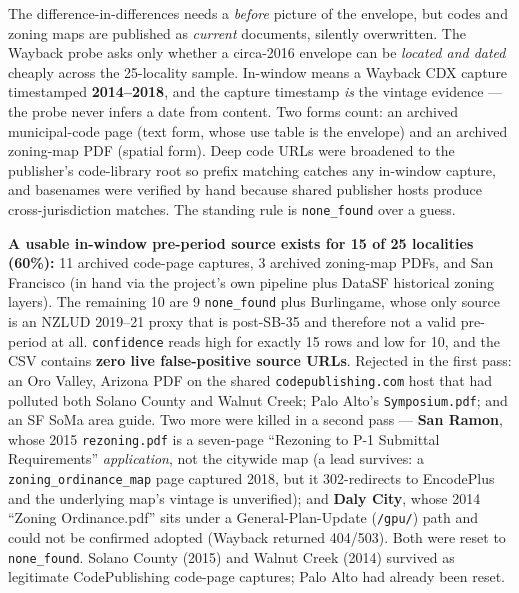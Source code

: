 \documentclass[11pt]{article}
\begin{document}
The difference-in-differences needs a \emph{before} picture of the envelope, but codes and zoning
maps are published as \emph{current} documents, silently overwritten. The Wayback probe asks only
whether a circa-2016 envelope can be \emph{located and dated} cheaply across the 25-locality
sample. In-window means a Wayback CDX capture timestamped \textbf{2014--2018}, and the capture
timestamp \emph{is} the vintage evidence --- the probe never infers a date from content. Two forms
count: an archived municipal-code page (text form, whose use table is the envelope) and an
archived zoning-map PDF (spatial form). Deep code URLs were broadened to the publisher's
code-library root so prefix matching catches any in-window capture, and basenames were verified by
hand because shared publisher hosts produce cross-jurisdiction matches. The standing rule is
\texttt{none\_found} over a guess.

\textbf{A usable in-window pre-period source exists for 15 of 25 localities (60\%):} 11 archived
code-page captures, 3 archived zoning-map PDFs, and San Francisco (in hand via the project's own
pipeline plus DataSF historical zoning layers). The remaining 10 are 9 \texttt{none\_found} plus
Burlingame, whose only source is an NZLUD 2019--21 proxy that is post-SB-35 and therefore not a
valid pre-period at all. \texttt{confidence} reads high for exactly 15 rows and low for 10, and
the CSV contains \textbf{zero live false-positive source URLs}. Rejected in the first pass: an
Oro Valley, Arizona PDF on the shared \texttt{codepublishing.com} host that had polluted both
Solano County and Walnut Creek; Palo Alto's \texttt{Symposium.pdf}; and an SF SoMa area guide.
Two more were killed in a second pass --- \textbf{San Ramon}, whose 2015 \texttt{rezoning.pdf} is
a seven-page ``Rezoning to P-1 Submittal Requirements'' \emph{application}, not the citywide map
(a lead survives: a \texttt{zoning\_ordinance\_map} page captured 2018, but it 302-redirects to
EncodePlus and the underlying map's vintage is unverified); and \textbf{Daly City}, whose 2014
``Zoning Ordinance.pdf'' sits under a General-Plan-Update (\texttt{/gpu/}) path and could not be
confirmed adopted (Wayback returned 404/503). Both were reset to \texttt{none\_found}. Solano
County (2015) and Walnut Creek (2014) survived as legitimate CodePublishing code-page captures;
Palo Alto had already been reset.
\end{document}
